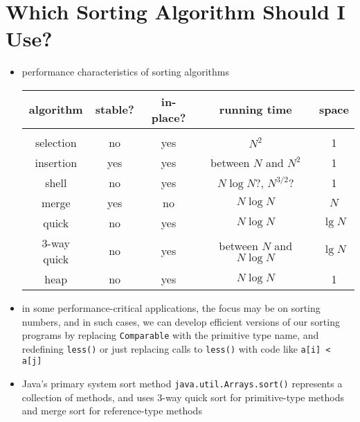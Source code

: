 \documentclass[8pt,a4paper,compress]{beamer}
\begin{document}
\section{Which Sorting Algorithm Should I Use?}
\begin{frame}[fragile]
\begin{itemize}
\item performance characteristics of sorting algorithms
\begin{center}
\begin{tabular}{ccccc}
\textbf{algorithm} & \textbf{stable?} & \textbf{in-place?} & \textbf{running time} & \textbf{space} \\ \hline \\
selection & no & yes & $N^2$ & 1 \\
insertion & yes & yes & between $N$ and $N^2$ & 1 \\
shell & no & yes & $N\log N$?, $N^{3/2}$? & 1 \\
merge & yes & no & $N\log N$ & $N$ \\
quick & no & yes & $N\log N$ & $\lg N$ \\
3-way quick & no & yes & between $N$ and $N\log N$ & $\lg N$ \\
heap & no & yes & $N\log N$ & 1
\end{tabular} 
\end{center}

\item in some performance-critical applications, the focus may be on sorting numbers, and in such cases, we can develop efficient versions of our sorting programs by replacing \lstinline$Comparable$ with the primitive type name, and redefining \lstinline$less()$ or just replacing calls to \lstinline$less()$ with code like \lstinline$a[i] < a[j]$

\item Java's primary system sort method  \lstinline$java.util.Arrays.sort()$ represents a collection of methods, and uses 3-way quick sort for primitive-type methods and merge sort for reference-type methods
\end{itemize}
\end{frame}
\end{document}
